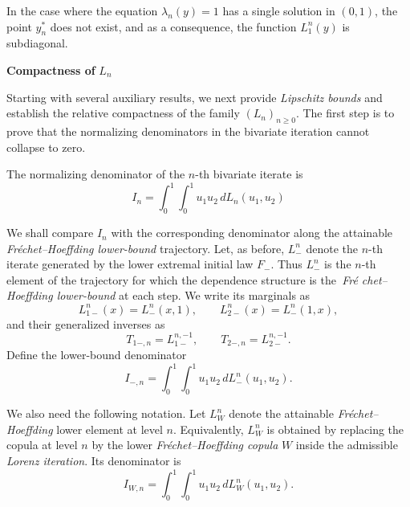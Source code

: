 \documentclass[onecolumn]{article}
\begin{document}
In the case where the equation $\lambda _{n}(y)=1$ has a single solution in $%
(0,1)$, the point $y_{n}^{\ast }$ does not exist, and as a consequence, the
function $L_{1}^{n}(y)$ is subdiagonal.

\begin{flushleft}
\textbf{Compactness of }$L_{n}$
\end{flushleft}

Starting with several auxiliary results, we next provide \textit{Lipschitz
bounds} and establish the relative compactness of the family $(L_{n})_{n\geq
0}$. The first step is to prove that the normalizing denominators in the
bivariate iteration cannot collapse to zero.

The normalizing denominator of the $n$-th bivariate iterate is 
\begin{equation*}
I_{n}=\int_{0}^{1}\int_{0}^{1}u_{1}u_{2}\,dL_{n}(u_{1},u_{2})
\end{equation*}

We shall compare $I_{n}$ with the corresponding denominator along the
attainable \textit{Fr\'{e}chet--Hoeffding lower-bound} trajectory. Let, as
before, $L_{-}^{n}$ denote the $n$-th iterate generated by the lower
extremal initial law $F_{-}$. Thus $L_{-}^{n}$ is the $n$-th element of the
trajectory for which the dependence structure is the\textit{\ Fr\'{e}%
chet--Hoeffding lower-bound} at each step. We write its marginals as 
\begin{equation*}
L_{1-}^{n}(x)=L_{-}^{n}(x,1),\qquad L_{2-}^{n}(x)=L_{-}^{n}(1,x),
\end{equation*}%
and their generalized inverses as 
\begin{equation*}
T_{1-,n}=L_{1-}^{n,-1},\qquad T_{2-,n}=L_{2-}^{n,-1}.
\end{equation*}%
Define the lower-bound denominator 
\begin{equation}
I_{-,n}=\int_{0}^{1}\int_{0}^{1}u_{1}u_{2}\,dL_{-}^{n}(u_{1},u_{2}).
\label{345a23}
\end{equation}

We also need the following notation. Let $L_{W}^{n}$ denote the attainable 
\textit{Fr\'{e}chet--Hoeffding} lower element at level $n$. Equivalently, $%
L_{W}^{n}$ is obtained by replacing the copula at level $n$ by the lower 
\textit{Fr\'{e}chet--Hoeffding copula} $W$ inside the admissible \textit{%
Lorenz iteration}. Its denominator is 
\begin{equation}
I_{W,n}=\int_{0}^{1}\int_{0}^{1}u_{1}u_{2}\,dL_{W}^{n}(u_{1},u_{2}).
\label{345a24}
\end{equation}
\end{document}
